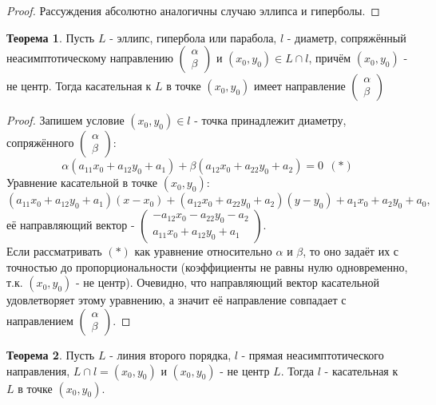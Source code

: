 \documentclass[a4paper, 12pt]{article}
\theoremstyle{definition}
\newtheorem*{theorem}{Теорема}
\begin{document}
	\begin{proof}
		Рассуждения абсолютно аналогичны случаю эллипса и гиперболы.
	\end{proof}
	\begin{theorem}
		Пусть $L$ - эллипс, гипербола или парабола, $l$ - диаметр, сопряжённый неасимптотическому направлению $\begin{pmatrix} \alpha \\ \beta \end{pmatrix}$ и $(x_0, y_0) \in L \cap l$, причём $(x_0, y_0)$ - не центр. Тогда касательная к $L$ в точке $(x_0, y_0)$ имеет направление $\begin{pmatrix} \alpha \\ \beta \end{pmatrix}$ 
	\end{theorem}
	\begin{proof}
		Запишем условие $(x_0, y_0) \in l$ - точка принадлежит диаметру, сопряжённого $\begin{pmatrix} \alpha \\ \beta \end{pmatrix}$: $$\alpha(a_{11}x_0 + a_{12}y_0 + a_1) + \beta(a_{12}x_0 + a_{22}y_0 + a_2) = 0 \ \ (*)$$
		Уравнение касательной в точке $(x_0, y_0)$: $$(a_{11}x_0 + a_{12}y_0 + a_1)(x-x_0) + (a_{12}x_0 + a_{22}y_0 + a_2)(y-y_0) + a_1x_0 + a_2y_0 + a_0,$$ её направляющий вектор - $\begin{pmatrix} -a_{12}x_0 - a_{22}y_0 - a_2 \\ a_{11}x_0 + a_{12}y_0 + a_1 \end{pmatrix}$.\\
		Если рассматривать $(*)$ как уравнение относительно $\alpha$ и $\beta$, то оно задаёт их с точностью до пропорциональности (коэффициенты не равны нулю одновременно, т.к. $(x_0, y_0)$ - не центр). Очевидно, что направляющий вектор касательной удовлетворяет этому уравнению, а значит её направление совпадает с направлением $\begin{pmatrix} \alpha \\ \beta \end{pmatrix}$.
	\end{proof}
	\begin{theorem}
		Пусть $L$ - линия второго порядка, $l$ - прямая неасимптотического направления, $L\cap l = {(x_0, y_0)}$ и $(x_0, y_0)$ - не центр $L$. Тогда $l$ - касательная к $L$ в точке $(x_0, y_0)$.
	\end{theorem}
\end{document}
